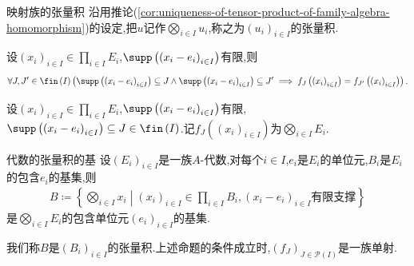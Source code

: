 \begin{definition}{映射族的张量积}{}
	沿用推论(\cref{cor:uniqueness-of-tensor-product-of-family-algebra-homomorphism})的设定,把$u$记作$\bigotimes\limits_{i\in I}u_{i}$,称之为$\left(u_{i}\right)_{i\in I}$的张量积.
\end{definition}

\begin{remark}{}{}
	设$\left(x_{i}\right)_{i\in I}\in\prod\limits_{i\in I}E_{i}$,$\supp\left(\left(x_{i}-e_{i}\right)_{i\in I}\right)$有限,则
	\begin{align*}
		\forall J,J^{\prime}\in\fin\left(I\right)\left(\supp\left(\left(x_{i}-e_{i}\right)_{i\in I}\right)\subseteq J\wedge\supp\left(\left(x_{i}-e_{i}\right)_{i\in I}\right)\subseteq J^{\prime}\implies f_{J}\left(\left(x_{i}\right)_{i\in I}\right)=f_{J^{\prime}}\left(\left(x_{i}\right)_{i\in I}\right)\right).
	\end{align*}
\end{remark}

\begin{definition}{}{}
	设$\left(x_{i}\right)_{i\in I}\in\prod\limits_{i\in I}E_{i}$,$\supp\left(\left(x_{i}-e_{i}\right)_{i\in I}\right)$有限,$\supp\left(\left(x_{i}-e_{i}\right)_{i\in I}\right)\subseteq J\in\fin\left(I\right)$.记$f_{J}\left(\left(x_{i}\right)_{i\in I}\right)$为$\bigotimes\limits_{i\in I}E_{i}$.
\end{definition}

\begin{proposition}{代数的张量积的基}{}
	设$\left(E_{i}\right)_{i\in I}$是一族$A$-代数,对每个$i\in I$,$e_{i}$是$E_{i}$的单位元,$B_{i}$是$E_{i}$的包含$e_{i}$的基集,则
	\begin{align*}
		B\coloneq\left\{\bigotimes\limits_{i\in I}x_{i}\middle|\left(x_{i}\right)_{i\in I}\in\prod\limits_{i\in I}B_{i},\left(x_{i}-e_{i}\right)_{i\in I}\text{有限支撑}\right\}
	\end{align*}
	是$\bigotimes\limits_{i\in I}E_{i}$的包含单位元$\left(e_{i}\right)_{i\in I}$的基集.
\end{proposition}

\begin{remark}{}{}
	我们称$B$是$\left(B_{i}\right)_{i\in I}$的张量积.上述命题的条件成立时,$\left(f_{J}\right)_{J\in\mathcal{P}\left(I\right)}$是一族单射.
\end{remark}









































